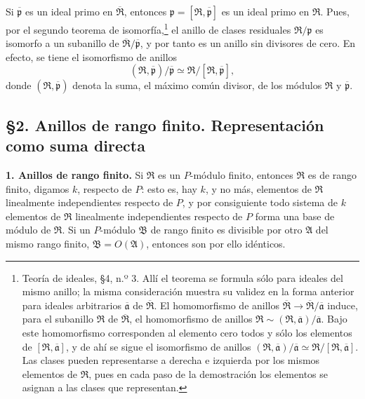 \documentclass[11pt]{article}
\begin{document}
Si $\overline{\mathfrak p}$ es un ideal primo en $\overline{\mathfrak R}$, entonces $\mathfrak p=[\mathfrak R,\overline{\mathfrak p}]$ es un ideal primo en $\mathfrak R$. Pues, por el segundo teorema de isomorfía,\footnote{Teoría de ideales, \S 4, n.º 3. Allí el teorema se formula sólo para ideales del mismo anillo; la misma consideración muestra su validez en la forma anterior para ideales arbitrarios $\overline{\mathfrak a}$ de $\overline{\mathfrak R}$. El homomorfismo de anillos $\overline{\mathfrak R}\to\overline{\mathfrak R}/\overline{\mathfrak a}$ induce, para el subanillo $\mathfrak R$ de $\overline{\mathfrak R}$, el homomorfismo de anillos $\mathfrak R\sim(\mathfrak R,\overline{\mathfrak a})/\overline{\mathfrak a}$. Bajo este homomorfismo corresponden al elemento cero todos y sólo los elementos de $[\mathfrak R,\overline{\mathfrak a}]$, y de ahí se sigue el isomorfismo de anillos $(\mathfrak R,\overline{\mathfrak a})/\overline{\mathfrak a}\simeq \mathfrak R/[\mathfrak R,\overline{\mathfrak a}]$. Las clases pueden representarse a derecha e izquierda por los mismos elementos de $\mathfrak R$, pues en cada paso de la demostración los elementos se asignan a las clases que representan.} el anillo de clases residuales $\mathfrak R/\mathfrak p$ es isomorfo a un subanillo de $\overline{\mathfrak R}/\overline{\mathfrak p}$, y por tanto es un anillo sin divisores de cero. En efecto, se tiene el isomorfismo de anillos
\[
   (\mathfrak R,\overline{\mathfrak p})/\overline{\mathfrak p}
   \simeq \mathfrak R/[\mathfrak R,\overline{\mathfrak p}],
\]
donde $(\mathfrak R,\overline{\mathfrak p})$ denota la suma, el máximo común divisor, de los módulos $\mathfrak R$ y $\overline{\mathfrak p}$.

\subsection*{\S 2. Anillos de rango finito. Representación como suma directa}

\textbf{1. Anillos de rango finito.} Si $\mathfrak R$ es un $P$-módulo finito, entonces $\mathfrak R$ es de rango finito, digamos $k$, respecto de $P$: esto es, hay $k$, y no más, elementos de $\mathfrak R$ linealmente independientes respecto de $P$, y por consiguiente todo sistema de $k$ elementos de $\mathfrak R$ linealmente independientes respecto de $P$ forma una base de módulo de $\mathfrak R$. Si un $P$-módulo $\mathfrak B$ de rango finito es divisible por otro $\mathfrak A$ del mismo rango finito, $\mathfrak B=O(\mathfrak A)$, entonces son por ello idénticos.
\end{document}
